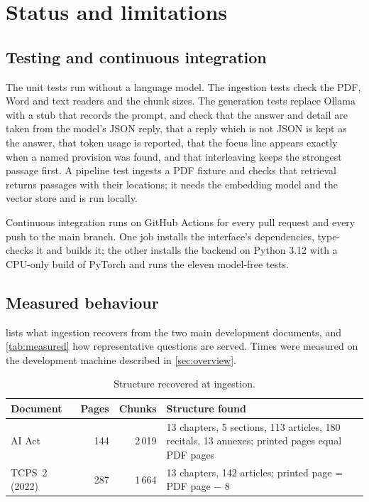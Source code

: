 \section{Status and limitations}
\label{sec:status}

\subsection{Testing and continuous integration}

The unit tests run without a language model. The ingestion tests check the
PDF, Word and text readers and the chunk sizes. The generation tests replace
Ollama with a stub that records the prompt, and check that the answer and
detail are taken from the model's JSON reply, that a reply which is not JSON
is kept as the answer, that token usage is reported, that the focus line
appears exactly when a named provision was found, and that interleaving keeps
the strongest passage first. A pipeline test ingests a PDF fixture and checks
that retrieval returns passages with their locations; it needs the embedding
model and the vector store and is run locally.

Continuous integration runs on GitHub Actions for every pull request and every
push to the main branch. One job installs the interface's dependencies,
type-checks it and builds it; the other installs the backend on Python 3.12
with a CPU-only build of PyTorch and runs the eleven model-free tests.

\subsection{Measured behaviour}

 lists what ingestion recovers from the two main development
documents, and \cref{tab:measured} how representative questions are served.
Times were measured on the development machine described in
\cref{sec:overview}.

\begin{table}[ht]
\centering
\small
\begin{tabularx}{\textwidth}{@{}lrrX@{}}
\toprule
Document & Pages & Chunks & Structure found \\
\midrule
AI Act~\cite{euaiact} & 144 & 2\,019 & 13 chapters, 5 sections, 113 articles,
                                       180 recitals, 13 annexes; printed pages
                                       equal PDF pages \\
TCPS~2 (2022)~\cite{tcps2} & 287 & 1\,664 & 13 chapters, 142 articles; printed
                                       page = PDF page $-$ 8 \\
\bottomrule
\end{tabularx}
\caption{Structure recovered at ingestion.}
\label{tab:corpora}
\end{table}

